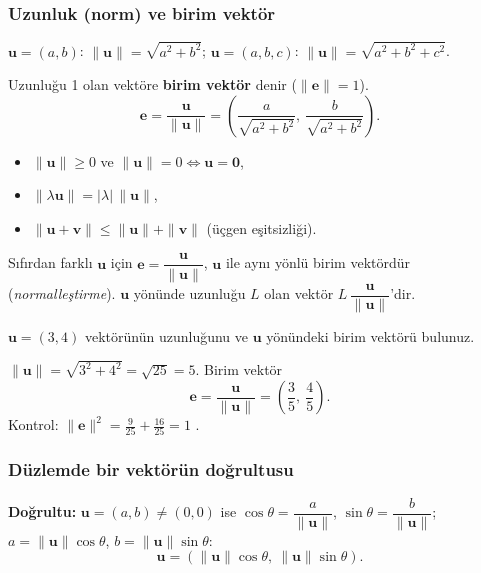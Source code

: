\subsubsection{Uzunluk (norm) ve birim vektör}

\begin{tahta}
$\mathbf u=(a,b)$: $\|\mathbf u\|=\sqrt{a^2+b^2}$; \quad $\mathbf u=(a,b,c)$: $\|\mathbf u\|=\sqrt{a^2+b^2+c^2}$.

Uzunluğu 1 olan vektöre \textbf{birim vektör} denir ($\|\mathbf e\|=1$).
\[
\mathbf e=\frac{\mathbf u}{\|\mathbf u\|}=\left(\frac{a}{\sqrt{a^2+b^2}},\ \frac{b}{\sqrt{a^2+b^2}}\right).
\]
\end{tahta}

\begin{teorem}
\begin{itemize}
\item $\|\mathbf u\|\ge 0$ ve $\|\mathbf u\|=0\iff\mathbf u=\mathbf 0$,
\item $\|\lambda\mathbf u\|=|\lambda|\,\|\mathbf u\|$,
\item $\|\mathbf u+\mathbf v\|\le\|\mathbf u\|+\|\mathbf v\|$ \quad (üçgen eşitsizliği).
\end{itemize}
Sıfırdan farklı $\mathbf u$ için $\mathbf e=\dfrac{\mathbf u}{\|\mathbf u\|}$, $\mathbf u$ ile aynı yönlü birim vektördür (\emph{normalleştirme}). $\mathbf u$ yönünde uzunluğu $L$ olan vektör $L\,\dfrac{\mathbf u}{\|\mathbf u\|}$'dir.
\end{teorem}

\begin{soru}
$\mathbf u=(3,4)$ vektörünün uzunluğunu ve $\mathbf u$ yönündeki birim vektörü bulunuz.
\end{soru}
\begin{cevap}
$\|\mathbf u\|=\sqrt{3^2+4^2}=\sqrt{25}=5$. Birim vektör
\[
\mathbf e=\frac{\mathbf u}{\|\mathbf u\|}=\left(\frac35,\ \frac45\right).
\]
Kontrol: $\|\mathbf e\|^2=\frac{9}{25}+\frac{16}{25}=1$ \checkmark.
\end{cevap}

\subsubsection{Düzlemde bir vektörün doğrultusu}

\begin{tahta}
\textbf{Doğrultu:} $\mathbf u=(a,b)\neq(0,0)$ ise $\cos\theta=\dfrac{a}{\|\mathbf u\|}$, $\sin\theta=\dfrac{b}{\|\mathbf u\|}$; \ $a=\|\mathbf u\|\cos\theta$, $b=\|\mathbf u\|\sin\theta$:
\[
\mathbf u=(\|\mathbf u\|\cos\theta,\ \|\mathbf u\|\sin\theta).
\]
\end{tahta}

